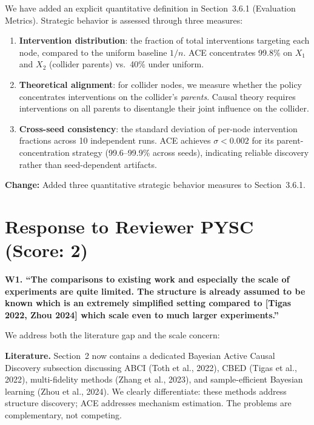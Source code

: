 \documentclass[11pt]{article}
\newcommand{\reviewer}[1]{\vspace{0.8em}\noindent\textbf{\textcolor{reviewercolor}{#1}}}
\newcommand{\response}{\vspace{0.3em}\noindent\textcolor{responsecolor}}
\newcommand{\change}[1]{\textcolor{changecolor}{\textbf{Change:} #1}}
\begin{document}
\response We have added an explicit quantitative definition in Section~3.6.1 (Evaluation Metrics). Strategic behavior is assessed through three measures:
\begin{enumerate}[nosep]
\item \textbf{Intervention distribution}: the fraction of total interventions targeting each node, compared to the uniform baseline $1/n$. ACE concentrates 99.8\% on $X_1$ and $X_2$ (collider parents) vs.\ 40\% under uniform.
\item \textbf{Theoretical alignment}: for collider nodes, we measure whether the policy concentrates interventions on the collider's \emph{parents}. Causal theory requires interventions on all parents to disentangle their joint influence on the collider.
\item \textbf{Cross-seed consistency}: the standard deviation of per-node intervention fractions across 10 independent runs. ACE achieves $\sigma < 0.002$ for its parent-concentration strategy (99.6--99.9\% across seeds), indicating reliable discovery rather than seed-dependent artifacts.
\end{enumerate}

\change{Added three quantitative strategic behavior measures to Section~3.6.1.}

\section{Response to Reviewer PYSC (Score: 2)}

\reviewer{W1. ``The comparisons to existing work and especially the scale of experiments are quite limited. The structure is already assumed to be known which is an extremely simplified setting compared to [Tigas 2022, Zhou 2024] which scale even to much larger experiments.''}

\response We address both the literature gap and the scale concern:

\textbf{Literature.} Section~2 now contains a dedicated Bayesian Active Causal Discovery subsection discussing ABCI (Toth et al., 2022), CBED (Tigas et al., 2022), multi-fidelity methods (Zhang et al., 2023), and sample-efficient Bayesian learning (Zhou et al., 2024). We clearly differentiate: these methods address structure discovery; ACE addresses mechanism estimation. The problems are complementary, not competing.
\end{document}
